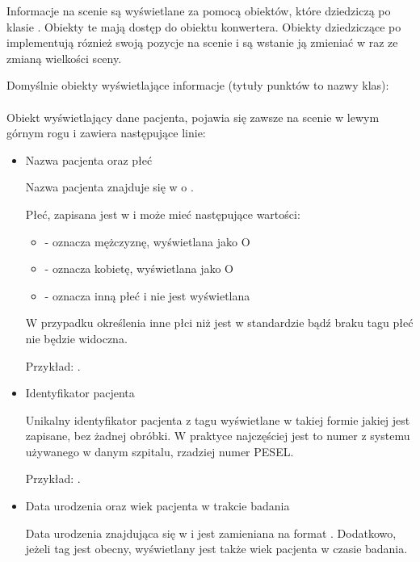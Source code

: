 
Informacje na scenie są wyświetlane za pomocą obiektów, które dziedziczą po klasie .
Obiekty te mają dostęp do obiektu konwertera.
Obiekty dziedziczące po  implementują róznież swoją pozycje na scenie i są wstanie ją zmieniać w raz ze zmianą wielkości sceny.

Domyślnie obiekty wyświetlające informacje (tytuły punktów to nazwy klas):
\paragraph{}

Obiekt wyświetlający dane pacjenta, pojawia się zawsze na scenie w lewym górnym rogu i zawiera następujące linie:
\begin{itemize}
    \item Nazwa pacjenta oraz płeć

          Nazwa pacjenta znajduje się w  o .

          Płeć, zapisana jest w  i może mieć następujące wartości:
          \begin{itemize}
              \item {} - oznacza mężczyznę, wyświetlana jako O
              \item {} - oznacza kobietę, wyświetlana jako O
              \item {} - oznacza inną płeć i nie jest wyświetlana
          \end{itemize}

          W przypadku określenia inne płci niż jest w standardzie bądź braku tagu płeć nie będzie widoczna.

          Przykład: .

    \item Identyfikator pacjenta

          Unikalny identyfikator pacjenta z tagu  wyświetlane w takiej formie jakiej jest zapisane, bez żadnej obróbki.
          W praktyce najczęściej jest to numer z systemu używanego w danym szpitalu, rzadziej numer PESEL.

          Przykład: .

    \item Data urodzenia oraz wiek pacjenta w trakcie badania

          Data urodzenia znajdująca się w  i jest zamieniana na format .
          Dodatkowo, jeżeli tag  jest obecny, wyświetlany jest także wiek pacjenta w czasie badania.


\end{itemize}
